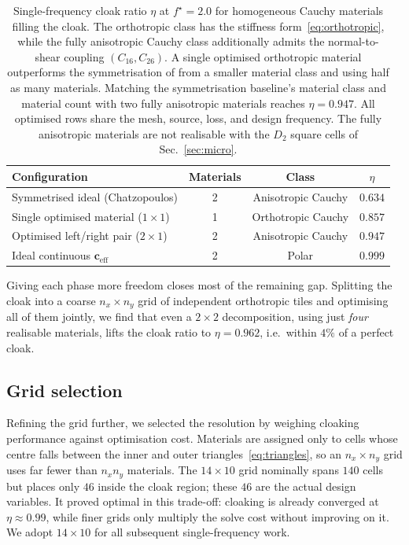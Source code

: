 \documentclass[preprint,12pt]{elsarticle}
\newcommand{\mbf}[1]{\mathbf{#1}}
\begin{document}
\begin{table}[htbp]
\centering
\caption{Single-frequency cloak ratio $\eta$ at $f^\star=2.0$ for
homogeneous Cauchy materials filling the cloak. The orthotropic class
has the stiffness form~\eqref{eq:orthotropic}, while the fully
anisotropic Cauchy class additionally admits the normal-to-shear
coupling $(C_{16},C_{26})$. A single optimised orthotropic material
outperforms the symmetrisation of \citet{chatzopoulos2023} from a
smaller material class and using half as many materials. Matching the
symmetrisation baseline's material class and material count with two
fully anisotropic materials reaches $\eta=0.947$. All optimised rows
share the mesh, source, loss, and design frequency. The fully
anisotropic materials are not realisable with the $D_2$ square cells
of Sec.~\ref{sec:micro}.}
\label{tab:single_vs_sym}
\begin{tabular*}{\textwidth}{@{\extracolsep{\fill}}lccc@{}}
\toprule
Configuration & Materials & Class & $\eta$ \\
\midrule
Symmetrised ideal (Chatzopoulos)       & 2 & Anisotropic Cauchy & $0.634$ \\
Single optimised material ($1\times1$) & 1 & Orthotropic Cauchy & $0.857$ \\
Optimised left/right pair ($2\times1$) & 2 & Anisotropic Cauchy & $\mathbf{0.947}$ \\
\midrule
Ideal continuous $\mbf{c}_{\mathrm{eff}}$ & 2 & Polar & $0.999$ \\

\bottomrule
\end{tabular*}
\end{table}

Giving each phase more freedom closes most of the remaining gap. Splitting
the cloak into a coarse $n_x\times n_y$ grid of independent orthotropic tiles
and optimising all of them jointly, we find that even a $2\times2$
decomposition, using just \emph{four} realisable materials, lifts the cloak
ratio to $\eta=0.962$, i.e.\ within $4\%$ of a perfect cloak. 

\subsection{Grid selection}
\label{subsec:grid_selection}

Refining the grid further, we selected the resolution by weighing cloaking
performance against optimisation cost. Materials are assigned only to cells
whose centre falls between the inner and outer triangles~\eqref{eq:triangles},
so an $n_x\times n_y$ grid uses far fewer than $n_x n_y$ materials. The
$14\times10$ grid nominally spans $140$ cells but places only $46$ inside the
cloak region; these $46$ are the actual design variables. It proved optimal in
this trade-off: cloaking is already converged at $\eta\approx0.99$, while
finer grids only multiply the solve cost without improving on it. We adopt
$14\times10$ for all subsequent single-frequency work.
\end{document}
